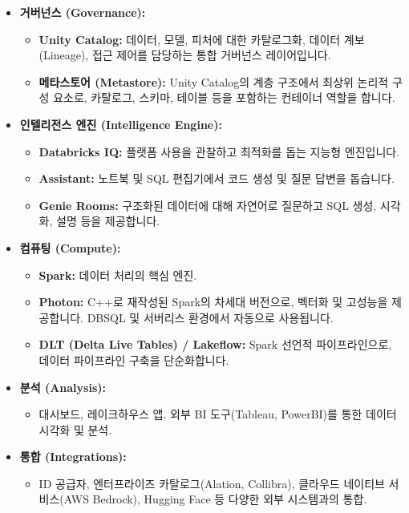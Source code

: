 \documentclass[11pt,a4paper]{article}
\theoremstyle{definition}
\begin{document}
\begin{itemize}
\begin{itemize}
        \item \textbf{Marketplace:} 타사 데이터(날씨, 신용 정보 등)를 가져오는 방법.
    \end{itemize}
    \item \textbf{거버넌스 (Governance):}
    \begin{itemize}
        \item \textbf{Unity Catalog:} 데이터, 모델, 피처에 대한 카탈로그화, 데이터 계보(Lineage), 접근 제어를 담당하는 통합 거버넌스 레이어입니다.
        \item \textbf{메타스토어 (Metastore):} Unity Catalog의 계층 구조에서 최상위 논리적 구성 요소로, 카탈로그, 스키마, 테이블 등을 포함하는 컨테이너 역할을 합니다.
    \end{itemize}
    \item \textbf{인텔리전스 엔진 (Intelligence Engine):}
    \begin{itemize}
        \item \textbf{Databricks IQ:} 플랫폼 사용을 관찰하고 최적화를 돕는 지능형 엔진입니다.
        \item \textbf{Assistant:} 노트북 및 SQL 편집기에서 코드 생성 및 질문 답변을 돕습니다.
        \item \textbf{Genie Rooms:} 구조화된 데이터에 대해 자연어로 질문하고 SQL 생성, 시각화, 설명 등을 제공합니다.
    \end{itemize}
    \item \textbf{컴퓨팅 (Compute):}
    \begin{itemize}
        \item \textbf{Spark:} 데이터 처리의 핵심 엔진.
        \item \textbf{Photon:} C++로 재작성된 Spark의 차세대 버전으로, 벡터화 및 고성능을 제공합니다. DBSQL 및 서버리스 환경에서 자동으로 사용됩니다.
        \item \textbf{DLT (Delta Live Tables) / Lakeflow:} Spark 선언적 파이프라인으로, 데이터 파이프라인 구축을 단순화합니다.
    \end{itemize}
    \item \textbf{분석 (Analysis):}
    \begin{itemize}
        \item 대시보드, 레이크하우스 앱, 외부 BI 도구(Tableau, PowerBI)를 통한 데이터 시각화 및 분석.
    \end{itemize}
    \item \textbf{통합 (Integrations):}
    \begin{itemize}
        \item ID 공급자, 엔터프라이즈 카탈로그(Alation, Collibra), 클라우드 네이티브 서비스(AWS Bedrock), Hugging Face 등 다양한 외부 시스템과의 통합.
    \end{itemize}
\end{itemize}
\end{document}

